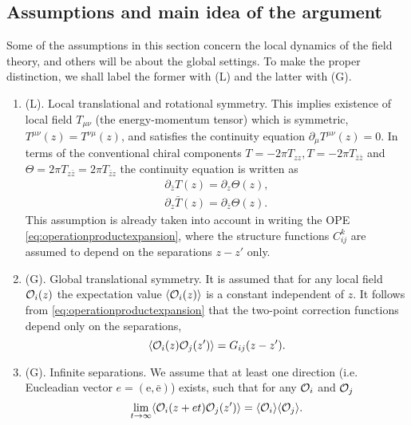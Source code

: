  \subsection{Assumptions and main idea of the argument}
 Some of the assumptions in this section concern the local dynamics of the
 field theory, and others  will be about the global settings. To make the
 proper distinction, we shall label the former with (L) and the latter with
 (G).
 \begin{enumerate}
  \item (L). Local translational and rotational symmetry. This implies
    existence of local field $T_{\mu\nu}$ (the energy-momentum tensor) which is
    symmetric, $T^{\mu\nu}(z) = T^{\nu\mu}(z)$, and satisfies the continuity 
    equation $\partial_\mu T^{\mu\nu}(z)=0$. In terms of the conventional
    chiral components $T = -2\pi T_{zz}, T=-2\pi T_{\bar{z}\bar{z}}$ and 
    $\Theta = 2\pi T_{z\bar{z}}=2\pi T_{\bar{z}z}$ the continuity equation is
    written as
    \begin{gather}
      \partial_{\bar{z}}T(z) = \partial_z \Theta(z),\\
      \partial_z\bar{T}(z) = \partial_\bar{z} \Theta(z).
      \label{eq:continuitytheta}
    \end{gather}
    This assumption is already taken into account in writing the OPE
    \eqref{eq:operationproductexpansion}, where the structure functions
    $C^k_{ij}$ are assumed to depend on the separations $z-z'$ only.
  \item (G). Global translational symmetry. It is assumed that for any
    local field $\mathcal{O}_i(z)$ the expectation value $\langle \mathcal{O}_i(z)\rangle$
    is a constant independent of $z$. It follows from
    \eqref{eq:operationproductexpansion} that the two-point correction
    functions depend only on the separations,
    \begin{equation}
      \langle \mathcal{O}_i(z)\mathcal{O}_j(z')\rangle = G_{ij}(z-z').
      \label{eq:cftseparations}
    \end{equation}
  \item (G). Infinite separations. We assume that at least one direction (i.e.
    Eucleadian vector $e = (\mathrm{e},\bar{\mathrm{e}})$) exists, such that
    for any $\mathcal{O}_i$ and $\mathcal{O}_j$
    \begin{equation}
      \lim_{t\rightarrow\infty}\langle \mathcal{O}_i(z+et)\mathcal{O}_j(z') \rangle
        = \langle \mathcal{O}_i\rangle\langle \mathcal{O}_j\rangle.
        \label{eq:infiniteseparations}
    \end{equation}

\end{enumerate}
